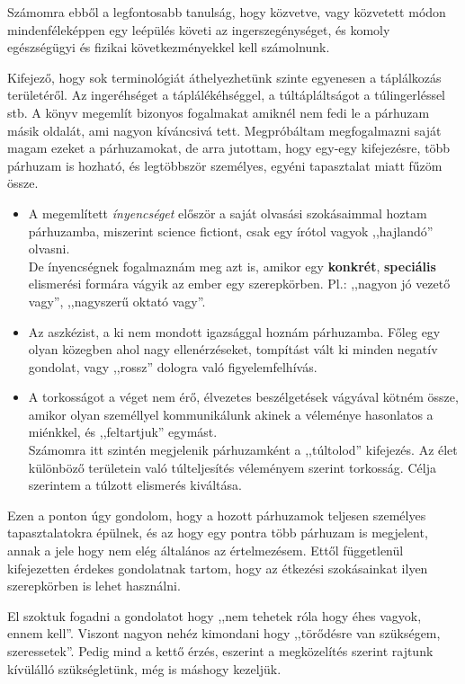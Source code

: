 \documentclass[a4paper,12pt]{article}
\begin{document}
	Számomra ebből a legfontosabb tanulság, hogy közvetve, vagy közvetett módon mindenféleképpen egy leépülés követi az ingerszegénységet, és komoly egészségügyi és fizikai következményekkel kell számolnunk.
	
	Kifejező, hogy sok terminológiát áthelyezhetünk szinte egyenesen a táplálkozás területéről. Az ingeréhséget a táplálékéhséggel, a túltápláltságot a túlingerléssel stb. A könyv megemlít bizonyos fogalmakat amiknél nem fedi le a párhuzam másik oldalát, ami nagyon kíváncsivá tett.
	Megpróbáltam  megfogalmazni saját magam ezeket a párhuzamokat, de arra jutottam, hogy egy-egy kifejezésre, több párhuzam is hozható, és legtöbbször személyes, egyéni tapasztalat miatt fűzöm össze. 
	\begin{itemize}
		\item A megemlített \textit{ínyencséget} először a saját olvasási szokásaimmal hoztam párhuzamba, miszerint science fictiont, csak egy írótol vagyok ,,hajlandó'' olvasni. \\
		De ínyencségnek fogalmaznám meg azt is, amikor egy \textbf{konkrét}, \textbf{speciális} elismerési formára vágyik az ember egy szerepkörben. Pl.: ,,nagyon jó vezető vagy'', ,,nagyszerű oktató vagy''.
		\item Az aszkézist, a ki nem mondott igazsággal hoznám párhuzamba. Főleg egy olyan közegben ahol nagy ellenérzéseket, tompítást vált ki minden negatív gondolat, vagy ,,rossz'' dologra való figyelemfelhívás.
		\item A torkosságot a véget nem érő, élvezetes beszélgetések vágyával kötném össze, amikor olyan személlyel kommunikálunk akinek a véleménye hasonlatos a miénkkel, és ,,feltartjuk'' egymást. \\
		Számomra itt szintén megjelenik párhuzamként a ,,túltolod'' kifejezés. Az élet különböző területein való túlteljesítés véleményem szerint torkosság. Célja szerintem a túlzott elismerés kiváltása.
	\end{itemize}
	Ezen a ponton úgy gondolom, hogy a hozott párhuzamok teljesen személyes tapasztalatokra épülnek, és az hogy egy pontra több párhuzam is megjelent, annak a jele hogy nem elég általános az értelmezésem. Ettől függetlenül kifejezetten érdekes gondolatnak tartom, hogy az étkezési szokásainkat ilyen szerepkörben is lehet használni.
	
	El szoktuk fogadni a gondolatot hogy ,,nem tehetek róla hogy éhes vagyok, ennem kell''. Viszont nagyon nehéz kimondani hogy ,,törődésre van szükségem, szeressetek''. Pedig mind a kettő érzés, eszerint a megközelítés szerint rajtunk kívülálló szükségletünk, még is máshogy kezeljük.
	
\end{document}
